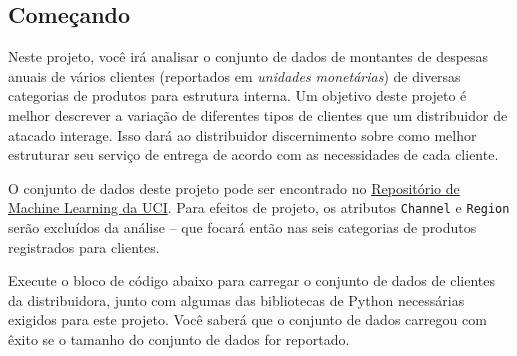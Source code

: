 \documentclass[11pt]{article}
\begin{document}
    \subsection{Começando}\label{comeuxe7ando}

Neste projeto, você irá analisar o conjunto de dados de montantes de
despesas anuais de vários clientes (reportados em \emph{unidades
monetárias}) de diversas categorias de produtos para estrutura interna.
Um objetivo deste projeto é melhor descrever a variação de diferentes
tipos de clientes que um distribuidor de atacado interage. Isso dará ao
distribuidor discernimento sobre como melhor estruturar seu serviço de
entrega de acordo com as necessidades de cada cliente.

O conjunto de dados deste projeto pode ser encontrado no
\href{https://archive.ics.uci.edu/ml/datasets/Wholesale+customers}{Repositório
de Machine Learning da UCI}. Para efeitos de projeto, os atributos
\texttt{\textquotesingle{}Channel\textquotesingle{}} e
\texttt{\textquotesingle{}Region\textquotesingle{}} serão excluídos da
análise -- que focará então nas seis categorias de produtos registrados
para clientes.

Execute o bloco de código abaixo para carregar o conjunto de dados de
clientes da distribuidora, junto com algumas das bibliotecas de Python
necessárias exigidos para este projeto. Você saberá que o conjunto de
dados carregou com êxito se o tamanho do conjunto de dados for
reportado.
\end{document}
